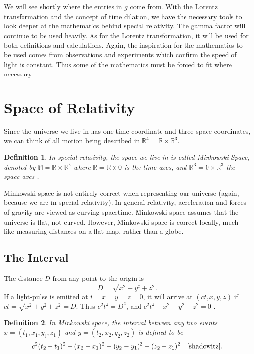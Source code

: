 \documentclass[12pt]{article}
\theoremstyle{defn}
\newtheorem{defn}{Definition}
\theoremstyle{pf}
\newcommand{\M}{\mathbb{M}}
\newcommand{\R}{\mathbb{R}}
\newcommand{\0}{\emptyset}
\renewcommand{\-}{\setminus}
\begin{document}
We will see shortly where the entries in $g$ come from. With the Lorentz transformation and the concept of time dilation, we have the necessary tools to look deeper at the mathematics behind  special relativity. The gamma factor will continue to be used heavily. As for the Lorentz transformation, it will be used for both definitions and calculations. Again, the inspiration for the mathematics to be used comes from observations and experiments which confirm the speed of light is constant. Thus some of the mathematics must be forced to fit where necessary.

\section{Space of Relativity}

Since the universe we live in has one time coordinate and three space coordinates, we can think of all motion being described in $\R^4=\R\times\R^3$. 

\begin{defn}In special relativity, the space we live in is called \textit{Minkowski Space}, denoted by $\M=\R\times\R^3$ where $\R=\R\times 0$ is the time axes, and $\R^3=0\times \R^3$ the space axes \cite{zeeman}.\end{defn}

Minkowski space is not entirely correct when representing our universe (again, because we are in special relativity). In general relativity, acceleration and forces of gravity are viewed as curving spacetime. Minkowski space assumes that the universe is flat, not curved. However, Minkowski space is correct locally, much like measuring distances on a flat map, rather than a globe. 

\subsection{The Interval}

The distance $D$ from any point to the origin is $$D=\sqrt{x^2+y^2+z^2}.$$ If a light-pulse is emitted at $t=x=y=z=0$, it will arrive at $(ct,x,y,z)$ if $ct=\sqrt{x^2+y^2+z^2}=D$. Thus $c^2t^2=D^2$, and $c^2t^2-x^2-y^2-z^2=0$ \cite{shadowitz}.

\begin{defn}In Minkowski space, the \textit{interval} between any two events $x=(t_1,x_1,y_1,z_1)$ and $y=(t_2,x_2,y_2,z_2)$ is defined to be $$c^2(t_2-t_1)^2-(x_2-x_1)^2-(y_2-y_1)^2-(z_2-z_1)^2 \quad \mbox{\cite{shadowitz}}.$$ 
\end{defn}
\end{document}
